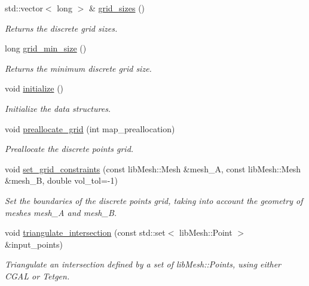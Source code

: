 \begin{DoxyCompactItemize}
std\+::vector$<$ long $>$ \& \hyperlink{classcarl_1_1_mesh___intersection_a6a238cd3b0cd60d9bb7a19ad3165bd54}{grid\+\_\+sizes} ()
\begin{DoxyCompactList}\small\item\em Returns the discrete grid sizes. \end{DoxyCompactList}\item 
long \hyperlink{classcarl_1_1_mesh___intersection_a6608de84c7eafe85c8685692abe2ca2e}{grid\+\_\+min\+\_\+size} ()
\begin{DoxyCompactList}\small\item\em Returns the minimum discrete grid size. \end{DoxyCompactList}\item 
void \hyperlink{classcarl_1_1_mesh___intersection_a195605fd295d5afc638129309103f576}{initialize} ()
\begin{DoxyCompactList}\small\item\em Initialize the data structures. \end{DoxyCompactList}\item 
void \hyperlink{classcarl_1_1_mesh___intersection_aee962f4dc634b4187cb759d6bf022d40}{preallocate\+\_\+grid} (int map\+\_\+preallocation)
\begin{DoxyCompactList}\small\item\em Preallocate the discrete points grid. \end{DoxyCompactList}\item 
void \hyperlink{classcarl_1_1_mesh___intersection_ace934a9b46e71e7071566b448474a5aa}{set\+\_\+grid\+\_\+constraints} (const lib\+Mesh\+::\+Mesh \&mesh\+\_\+\+A, const lib\+Mesh\+::\+Mesh \&mesh\+\_\+\+B, double vol\+\_\+tol=-\/1)
\begin{DoxyCompactList}\small\item\em Set the boundaries of the discrete points grid, taking into account the geometry of meshes mesh\+\_\+\+A and mesh\+\_\+\+B. \end{DoxyCompactList}\item 
void \hyperlink{classcarl_1_1_mesh___intersection_aa8a75085ca6f75f96ad47e36b6dd8509}{triangulate\+\_\+intersection} (const std\+::set$<$ lib\+Mesh\+::\+Point $>$ \&input\+\_\+points)
\begin{DoxyCompactList}\small\item\em Triangulate an intersection defined by a set of lib\+Mesh\+::\+Points, using either C\+G\+A\+L or Tetgen. \end{DoxyCompactList}\item 

\end{DoxyCompactItemize}
